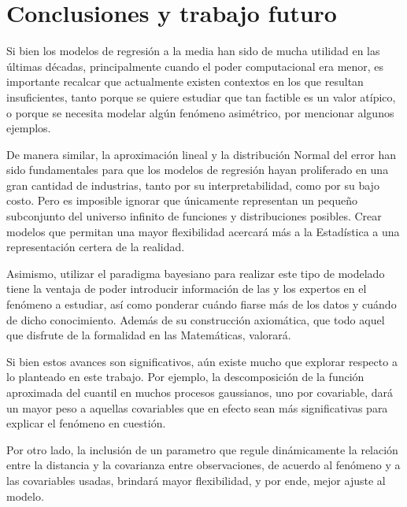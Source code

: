 \chapter[Conclusiones y trabajo futuro]{Conclusiones y trabajo futuro}

Si bien los modelos de regresi\'on a la media han sido de mucha utilidad en las \'ultimas d\'ecadas, principalmente cuando el poder computacional era menor, es importante recalcar que actualmente existen contextos en los que resultan insuficientes, tanto porque se quiere estudiar que tan factible es un valor at\'ipico, o porque se necesita modelar alg\'un fen\'omeno asim\'etrico, por mencionar algunos ejemplos.

De manera similar, la aproximaci\'on lineal y la distribuci\'on Normal del error han sido fundamentales para que los modelos de regresi\'on hayan proliferado en una gran cantidad de industrias, tanto por su interpretabilidad, como por su bajo costo. Pero es imposible ignorar que \'unicamente representan un pequeño subconjunto del universo infinito de funciones y distribuciones posibles. Crear modelos que permitan una mayor flexibilidad acercar\'a m\'as a la Estad\'istica a una representaci\'on certera de la realidad.

Asimismo, utilizar el paradigma bayesiano para realizar este tipo de modelado tiene la ventaja de poder introducir informaci\'on de las y los expertos en el fen\'omeno a estudiar, as\'i como ponderar cu\'ando fiarse m\'as de los datos y cu\'ando de dicho conocimiento. Adem\'as de su construcci\'on axiom\'atica, que todo aquel que disfrute de la formalidad en las Matem\'aticas, valorar\'a.

Si bien estos avances son significativos, a\'un existe mucho que explorar respecto a lo planteado en este trabajo. Por ejemplo, la descomposici\'on de la funci\'on aproximada del cuantil en muchos procesos gaussianos, uno por covariable, dar\'a un mayor peso a aquellas covariables que en efecto sean m\'as significativas para explicar el fen\'omeno en cuesti\'on. 

Por otro lado, la inclusi\'on de un parametro que regule din\'amicamente la relaci\'on entre la distancia y la covarianza entre observaciones, de acuerdo al fen\'omeno y a las covariables usadas, brindar\'a mayor flexibilidad, y por ende, mejor ajuste al modelo.

\newpage 